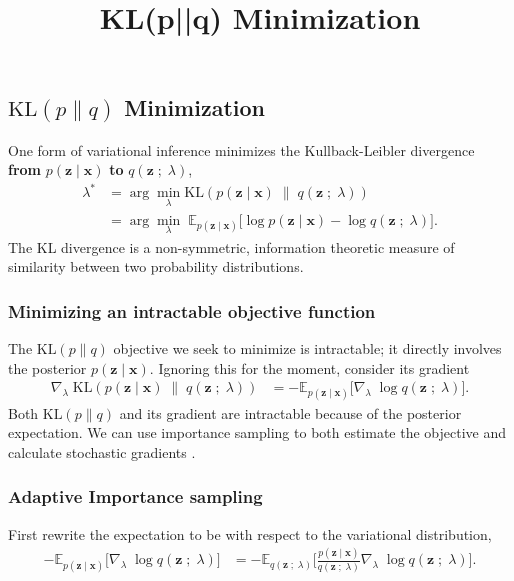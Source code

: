 \title{KL(p||q) Minimization}

\subsection{$\text{KL}(p\|q)$ Minimization}

One form of variational inference minimizes the Kullback-Leibler divergence
\textbf{from} $p(\mathbf{z} \mid \mathbf{x})$ \textbf{to} $q(\mathbf{z}\;;\;\lambda)$,
\begin{align*}
  \lambda^*
  &=
  \arg\min_\lambda \text{KL}(
  p(\mathbf{z} \mid \mathbf{x})
  \;\|\;
  q(\mathbf{z}\;;\;\lambda)
  )\\
  &=
  \arg\min_\lambda\;
  \mathbb{E}_{p(\mathbf{z} \mid \mathbf{x})}
  \big[
  \log p(\mathbf{z} \mid \mathbf{x})
  -
  \log q(\mathbf{z}\;;\;\lambda)
  \big].
\end{align*}
The KL divergence is a non-symmetric, information theoretic measure of
similarity between two probability distributions.

\subsubsection{Minimizing an intractable objective function}

The $\text{KL}(p\|q)$ objective we seek to minimize is intractable; it directly
involves the posterior $p(\mathbf{z} \mid \mathbf{x})$. Ignoring this for the moment, consider its
gradient
\begin{align*}
  \nabla_\lambda\;
  \text{KL}(
  p(\mathbf{z} \mid \mathbf{x})
  \;\|\;
  q(\mathbf{z}\;;\;\lambda)
  )
  &=
  -
  \mathbb{E}_{p(\mathbf{z} \mid \mathbf{x})}
  \big[
  \nabla_\lambda\;
  \log q(\mathbf{z}\;;\;\lambda)
  \big].
\end{align*}
Both $\text{KL}(p\|q)$ and its gradient are intractable
because of the posterior expectation.
We can use importance sampling to both
estimate the objective and calculate stochastic gradients
\citep{oh1992adaptive}.

\subsubsection{Adaptive Importance sampling}

First rewrite the expectation to be with respect to the variational
distribution,
\begin{align*}
  -
  \mathbb{E}_{p(\mathbf{z} \mid \mathbf{x})}
  \big[
  \nabla_\lambda\;
  \log q(\mathbf{z}\;;\;\lambda)
  \big]
  &=
  -
  \mathbb{E}_{q(\mathbf{z}\;;\;\lambda)}
  \Bigg[
  \frac{p(\mathbf{z} \mid \mathbf{x})}{q(\mathbf{z}\;;\;\lambda)}
  \nabla_\lambda\;
  \log q(\mathbf{z}\;;\;\lambda)
  \Bigg].
\end{align*}

